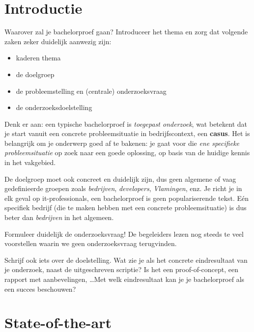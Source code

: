 
\section{Introductie}%
\label{sec:introductie}

Waarover zal je bachelorproef gaan? Introduceer het thema en zorg dat volgende zaken zeker duidelijk aanwezig zijn:

\begin{itemize}
  \item kaderen thema
  \item de doelgroep
  \item de probleemstelling en (centrale) onderzoeksvraag
  \item de onderzoeksdoelstelling
\end{itemize}

Denk er aan: een typische bachelorproef is \textit{toegepast onderzoek}, wat betekent dat je start vanuit een concrete probleemsituatie in bedrijfscontext, een \textbf{casus}. Het is belangrijk om je onderwerp goed af te bakenen: je gaat voor die \textit{ene specifieke probleemsituatie} op zoek naar een goede oplossing, op basis van de huidige kennis in het vakgebied.

De doelgroep moet ook concreet en duidelijk zijn, dus geen algemene of vaag gedefinieerde groepen zoals \emph{bedrijven}, \emph{developers}, \emph{Vlamingen}, enz. Je richt je in elk geval op it-professionals, een bachelorproef is geen populariserende tekst. Eén specifiek bedrijf (die te maken hebben met een concrete probleemsituatie) is dus beter dan \emph{bedrijven} in het algemeen.

Formuleer duidelijk de onderzoeksvraag! De begeleiders lezen nog steeds te veel voorstellen waarin we geen onderzoeksvraag terugvinden.

Schrijf ook iets over de doelstelling. Wat zie je als het concrete eindresultaat van je onderzoek, naast de uitgeschreven scriptie? Is het een proof-of-concept, een rapport met aanbevelingen, \ldots Met welk eindresultaat kan je je bachelorproef als een succes beschouwen?


\section{State-of-the-art}%
\label{sec:state-of-the-art}

